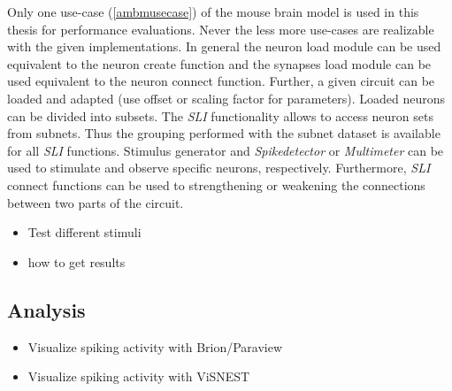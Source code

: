 Only one use-case (\ref{ambmusecase}) of the mouse brain model is used in this thesis for performance evaluations.
Never the less more use-cases are realizable with the given implementations.
In general the neuron load module can be used equivalent to the neuron create function
and the synapses load module can be used equivalent to the neuron connect function.
Further, a given circuit can be loaded and adapted (use offset or scaling factor for parameters).
Loaded neurons can be divided into subsets. The \emph{SLI} functionality allows to access neuron sets
from subnets. Thus the grouping performed with the subnet dataset is available for all \emph{SLI} functions.
Stimulus generator and \emph{Spikedetector} or \emph{Multimeter} can be used to stimulate
and observe specific neurons, respectively.
Furthermore, \emph{SLI} connect functions can be used to strengthening or weakening the connections between two
parts of the circuit.

\begin{itemize}
	  \item Test different stimuli
	  \item how to get results
\end{itemize}

\subsection{Analysis}
\begin{itemize}
	  \item Visualize spiking activity with Brion/Paraview
      \item Visualize spiking activity with ViSNEST
\end{itemize}